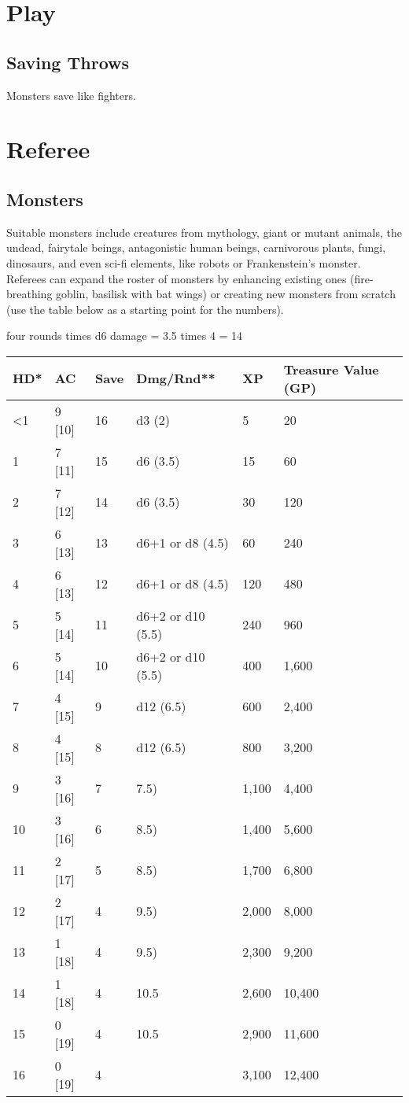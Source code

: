 \section{Play}\label{play}

\subsection{Saving Throws}\label{saving-throws}

Monsters save like fighters.

\section{Referee}\label{referee}

\subsection{Monsters}\label{monsters}

Suitable monsters include creatures from mythology, giant or mutant
animals, the undead, fairytale beings, antagonistic human beings,
carnivorous plants, fungi, dinosaurs, and even sci-fi elements, like
robots or Frankenstein's monster. Referees can expand the roster of
monsters by enhancing existing ones (fire-breathing goblin, basilisk
with bat wings) or creating new monsters from scratch (use the table
below as a starting point for the numbers).

four rounds times d6 damage = 3.5 times 4 = 14

\begin{longtable}[]{@{}llllll@{}}
\toprule
HD* & AC & Save & Dmg/Rnd** & XP & Treasure Value (GP)\tabularnewline
\midrule
\endhead
\textless{}1 & 9 {[}10{]} & 16 & d3 (2) & 5 & 20\tabularnewline
1 & 7 {[}11{]} & 15 & d6 (3.5) & 15 & 60\tabularnewline
2 & 7 {[}12{]} & 14 & d6 (3.5) & 30 & 120\tabularnewline
3 & 6 {[}13{]} & 13 & d6+1 or d8 (4.5) & 60 & 240\tabularnewline
4 & 6 {[}13{]} & 12 & d6+1 or d8 (4.5) & 120 & 480\tabularnewline
5 & 5 {[}14{]} & 11 & d6+2 or d10 (5.5) & 240 & 960\tabularnewline
6 & 5 {[}14{]} & 10 & d6+2 or d10 (5.5) & 400 & 1,600\tabularnewline
7 & 4 {[}15{]} & 9 & d12 (6.5) & 600 & 2,400\tabularnewline
8 & 4 {[}15{]} & 8 & d12 (6.5) & 800 & 3,200\tabularnewline
9 & 3 {[}16{]} & 7 & 7.5) & 1,100 & 4,400\tabularnewline
10 & 3 {[}16{]} & 6 & 8.5) & 1,400 & 5,600\tabularnewline
11 & 2 {[}17{]} & 5 & 8.5) & 1,700 & 6,800\tabularnewline
12 & 2 {[}17{]} & 4 & 9.5) & 2,000 & 8,000\tabularnewline
13 & 1 {[}18{]} & 4 & 9.5) & 2,300 & 9,200\tabularnewline
14 & 1 {[}18{]} & 4 & 10.5 & 2,600 & 10,400\tabularnewline
15 & 0 {[}19{]} & 4 & 10.5 & 2,900 & 11,600\tabularnewline
16 & 0 {[}19{]} & 4 & & 3,100 & 12,400\tabularnewline
\bottomrule
\end{longtable}

